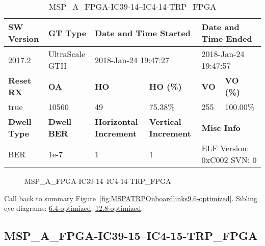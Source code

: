 \begin{table}[h]
\centering
\caption{MSP\_A\_FPGA-IC39-14--IC4-14-TRP\_FPGA}
\label{tab:MSPAFPGAIC3914IC414TRPFPGA9.6-optimized}
\begin{tabular}{@{}|l|l|l|l|l|l|@{}}
\toprule
\textbf{SW Version}                & \textbf{GT Type}   & \multicolumn{2}{l|}{\textbf{Date and Time Started}}            & \multicolumn{2}{l|}{\textbf{Date and Time Ended}}        \\ \midrule
2017.2                       & UltraScale GTH          & \multicolumn{2}{l|}{2018-Jan-24 19:47:27}                   & \multicolumn{2}{l|}{2018-Jan-24 19:47:57}               \\ \midrule
\textbf{Reset RX}                  & \textbf{OA} & \textbf{HO}   & \textbf{HO (\%)} & \textbf{VO} & \textbf{VO (\%)} \\ \midrule
true & 10560        & 49          & 75.38\%        & 255        & 100.00\%       \\ \midrule
\textbf{Dwell Type}                & \textbf{Dwell BER} & \textbf{Horizontal Increment} & \textbf{Vertical Increment}    & \multicolumn{2}{l|}{\textbf{Misc Info}}                  \\ \midrule
BER                            & 1e-7        & 1        & 1           & \multicolumn{2}{l|}{ELF Version: 0xC002 SVN: 0}                         \\ \bottomrule
\end{tabular}
\end{table}

\begin{figure}[h]
\caption{MSP\_A\_FPGA-IC39-14--IC4-14-TRP\_FPGA} \label{fig:MSPAFPGAIC3914IC414TRPFPGA9.6-optimized}
\end{figure}

Call back to summary Figure~\ref{fig:MSPATRPOnboardlinks9.6-optimized}.
Sibling eye diagrams: \hyperref[sec:MSPAFPGAIC3914IC414TRPFPGA6.4-optimized]{6.4-optimized}, \hyperref[sec:MSPAFPGAIC3914IC414TRPFPGA12.8-optimized]{12.8-optimized}.

\clearpage
\newpage


\subsection{MSP\_A\_FPGA-IC39-15--IC4-15-TRP\_FPGA}\label{sec:MSPAFPGAIC3915IC415TRPFPGA9.6-optimized}

